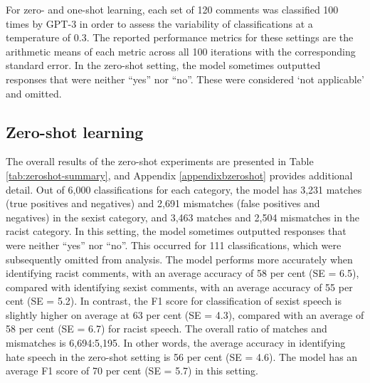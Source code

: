 \documentclass[12pt,]{article}
\begin{document}
For zero- and one-shot learning, each set of 120 comments was classified 100 times by GPT-3 in order to assess the variability of classifications at a temperature of 0.3. The reported performance metrics for these settings are the arithmetic means of each metric across all 100 iterations with the corresponding standard error. In the zero-shot setting, the model sometimes outputted responses that were neither ``yes'' nor ``no''. These were considered `not applicable' and omitted.

\hypertarget{zero-shot-learning-1}{%
\subsection{Zero-shot learning}\label{zero-shot-learning-1}}

The overall results of the zero-shot experiments are presented in Table \ref{tab:zeroshot-summary}, and Appendix \ref{appendixbzeroshot} provides additional detail. Out of 6,000 classifications for each category, the model has 3,231 matches (true positives and negatives) and 2,691 mismatches (false positives and negatives) in the sexist category, and 3,463 matches and 2,504 mismatches in the racist category. In this setting, the model sometimes outputted responses that were neither ``yes'' nor ``no''. This occurred for 111 classifications, which were subsequently omitted from analysis. The model performs more accurately when identifying racist comments, with an average accuracy of 58 per cent (SE = 6.5), compared with identifying sexist comments, with an average accuracy of 55 per cent (SE = 5.2). In contrast, the F1 score for classification of sexist speech is slightly higher on average at 63 per cent (SE = 4.3), compared with an average of 58 per cent (SE = 6.7) for racist speech. The overall ratio of matches and mismatches is 6,694:5,195. In other words, the average accuracy in identifying hate speech in the zero-shot setting is 56 per cent (SE = 4.6). The model has an average F1 score of 70 per cent (SE = 5.7) in this setting.
\end{document}
